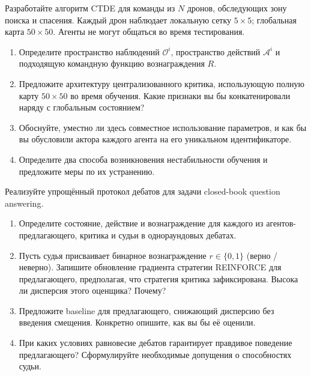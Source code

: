 \begin{exercise}
\label{ex:ctde-communication}
Разработайте алгоритм CTDE для команды из $N$ дронов, обследующих
зону поиска и спасения. Каждый дрон наблюдает локальную сетку $5 \times 5$; глобальная
карта $50 \times 50$. Агенты не могут общаться во время тестирования.
\begin{enumerate}[label=(\alph*)]
  \item Определите пространство наблюдений $\mathcal{O}^i$, пространство действий
    $\mathcal{A}^i$ и подходящую командную функцию вознаграждения $R$.
  \item Предложите архитектуру централизованного критика, использующую
    полную карту $50 \times 50$ во время обучения. Какие признаки вы бы
    конкатенировали наряду с глобальным состоянием?
  \item Обоснуйте, уместно ли здесь совместное использование параметров, и
    как бы вы обусловили актора каждого агента на его уникальном
    идентификаторе.
  \item Определите два способа возникновения нестабильности обучения и
    предложите меры по их устранению.
\end{enumerate}
\end{exercise}

\begin{exercise}
\label{ex:debate-reward}
Реализуйте упрощённый протокол дебатов для задачи closed-book
question answering.
\begin{enumerate}[label=(\alph*)]
  \item Определите состояние, действие и вознаграждение для каждого из
    агентов-предлагающего, критика и судьи в однораундовых дебатах.
  \item Пусть судья присваивает бинарное вознаграждение $r \in \{0, 1\}$
    (верно / неверно). Запишите обновление градиента стратегии REINFORCE
    для предлагающего, предполагая, что стратегия критика
    зафиксирована. Высока ли дисперсия этого оценщика?
    Почему?
  \item Предложите baseline для предлагающего, снижающий дисперсию
    без введения смещения. Конкретно опишите, как вы бы её оценили.
  \item При каких условиях равновесие дебатов гарантирует
    правдивое поведение предлагающего? Сформулируйте необходимые
    допущения о способностях судьи.
\end{enumerate}
\end{exercise}


